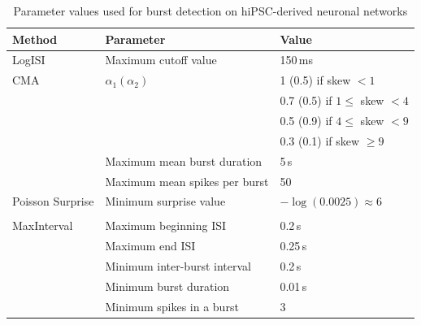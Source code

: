 \documentclass[12pt, titlepage]{article}
\begin{document}
		\begin{table}[h]
			\centering
			\begin{tabular}{|l|l|l|}
				\hline
				Method & Parameter & Value
				\\ \hline 
				\rowcolor{Gray} LogISI \cite{Pasquale2010} & Maximum cutoff value & 150$\,$ms
				\\ \hline
				CMA \cite{Kapucu2012} & $\alpha_1 (\alpha_2)$ & 1 (0.5) if skew $<1$
				\\ & &  0.7 (0.5) if $1 \leq $ skew $<4$
				\\ & & 0.5 (0.9) if $4 \leq $ skew $<9$
				\\ & & 0.3 (0.1) if  skew $\geq 9$
				\\ & Maximum mean burst duration & 5$\,$s
				\\ & Maximum mean spikes per burst & 50
				\\ \hline 
				\rowcolor{Gray} Poisson Surprise  & Minimum surprise value & $-\log(0.0025) \approx 6$\\
				\rowcolor{Gray} \cite{Legendy1985} &&\\ \hline 
				MaxInterval \cite{NEmanual} & Maximum beginning ISI & 0.2$\,$s
				\\ & Maximum end ISI & 0.25$\,$s
				\\ & Minimum inter-burst interval & 0.2$\,$s
				\\ & Minimum burst duration & 0.01$\,$s
				\\ & Minimum spikes in a burst & 3
				\\ \hline
			\end{tabular}
			\caption{Parameter values used for burst detection on hiPSC-derived neuronal networks}
			\label{param_vals_hum}
		\end{table}
\end{document}
